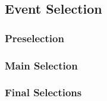 \subsection{Event Selection}

\subsubsection{Preselection}

\subsubsection{Main Selection}

\subsubsection{Final Selections}